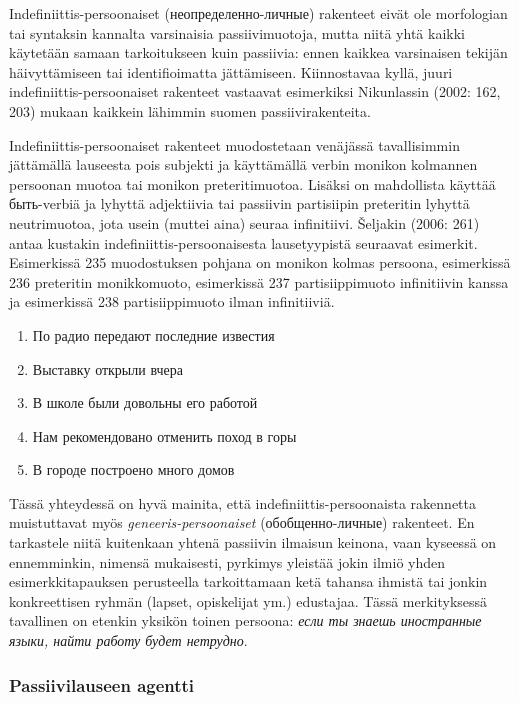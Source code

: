 \documentclass[]{scrartcl}
\providecommand{\tightlist}{%
  \setlength{\itemsep}{0pt}\setlength{\parskip}{0pt}}
\begin{document}
Indefiniittis-persoonaiset (неопределенно-личные) rakenteet eivät ole
morfologian tai syntaksin kannalta varsinaisia passiivimuotoja, mutta
niitä yhtä kaikki käytetään samaan tarkoitukseen kuin passiivia: ennen
kaikkea varsinaisen tekijän häivyttämiseen tai identifioimatta
jättämiseen. Kiinnostavaa kyllä, juuri indefiniittis-persoonaiset
rakenteet vastaavat esimerkiksi Nikunlassin (2002: 162, 203) mukaan
kaikkein lähimmin suomen passiivirakenteita.

Indefiniittis-persoonaiset rakenteet muodostetaan venäjässä
tavallisimmin jättämällä lauseesta pois subjekti ja käyttämällä verbin
monikon kolmannen persoonan muotoa tai monikon preteritimuotoa. Lisäksi
on mahdollista käyttää быть-verbiä ja lyhyttä adjektiivia tai passiivin
partisiipin preteritin lyhyttä neutrimuotoa, jota usein (muttei aina)
seuraa infinitiivi. Šeljakin (2006: 261) antaa kustakin
indefiniittis-persoonaisesta lausetyypistä seuraavat esimerkit.
Esimerkissä 235 muodostuksen pohjana on monikon kolmas persoona,
esimerkissä 236 preteritin monikkomuoto, esimerkissä 237
partisiippimuoto infinitiivin kanssa ja esimerkissä 238 partisiippimuoto
ilman infinitiiviä.

\begin{enumerate}
\def\labelenumi{(\arabic{enumi})}
\setcounter{enumi}{234}
\tightlist
\item
  По радио передают последние известия
\item
  Выставку открыли вчера
\item
  В школе были довольны его работой
\item
  Нам рекомендовано отменить поход в горы
\item
  В городе построено много домов
\end{enumerate}

Tässä yhteydessä on hyvä mainita, että indefiniittis-persoonaista
rakennetta muistuttavat myös \emph{geneeris-persoonaiset}
(обобщенно-личные) rakenteet. En tarkastele niitä kuitenkaan yhtenä
passiivin ilmaisun keinona, vaan kyseessä on ennemminkin, nimensä
mukaisesti, pyrkimys yleistää jokin ilmiö yhden esimerkkitapauksen
perusteella tarkoittamaan ketä tahansa ihmistä tai jonkin konkreettisen
ryhmän (lapset, opiskelijat ym.) edustajaa. Tässä merkityksessä
tavallinen on etenkin yksikön toinen persoona: \emph{если ты знаешь
иностранные языки, найти работу будет нетрудно}.

\subsubsection{Passiivilauseen agentti}\label{passiivilauseen-agentti}
\end{document}
